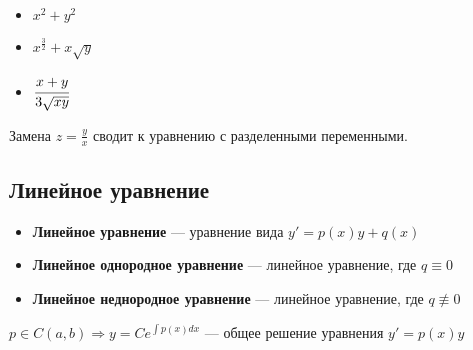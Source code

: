 \begin{example}\itemfix
    \begin{itemize}
        \item $x^2 + y^2$
        \item$x^{\frac{3}{2}} + x\sqrt y$
        \item $\cfrac{x+y}{3\sqrt{xy}}$
    \end{itemize}
\end{example}

Замена $z=\frac{y}{x}$ сводит к уравнению с разделенными переменными.

\subsection{Линейное уравнение}

\begin{definition}\itemfix
    \begin{itemize}
        \item \textbf{Линейное уравнение} --- уравнение вида $y'=p(x)y + q(x)$
        \item \textbf{Линейное однородное уравнение} --- линейное уравнение, где $q\equiv 0$
        \item \textbf{Линейное неднородное уравнение} --- линейное уравнение, где $q\not\equiv 0$
    \end{itemize}
\end{definition}

\begin{lemma}
    $p\in C(a, b) \Rightarrow y=Ce^{\int p(x)dx}$ --- общее решение уравнения $y'=p(x)y$
\end{lemma}

